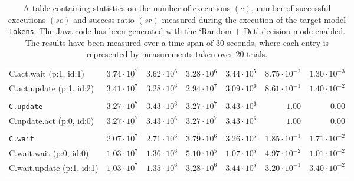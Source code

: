\begin{table}[htbp]
{\begin{tabular}{lrrrrrr}
\hspace{3mm}C.act.wait (p:1, id:1)    & $3.74 \cdot 10^{7}$ & $3.62 \cdot 10^{6}$ & $3.28 \cdot 10^{6}$ & $3.44 \cdot 10^{5}$ & $8.75 \cdot 10^{-2}$ & $1.30 \cdot 10^{-3}$ \\
\hspace{3mm}C.act.update (p:1, id:2)  & $3.41 \cdot 10^{7}$ & $3.28 \cdot 10^{6}$ & $2.94 \cdot 10^{7}$ & $3.09 \cdot 10^{6}$ & $8.61 \cdot 10^{-1}$ & $1.40 \cdot 10^{-2}$ \\
\\[-8pt]\texttt{C.update}             & $3.27 \cdot 10^{7}$ & $3.43 \cdot 10^{6}$ & $3.27 \cdot 10^{7}$ & $3.43 \cdot 10^{6}$ &               $1.00$ &               $0.00$ \\
\hspace{3mm}C.update.act (p:0, id:0)  & $3.27 \cdot 10^{7}$ & $3.43 \cdot 10^{6}$ & $3.27 \cdot 10^{7}$ & $3.43 \cdot 10^{6}$ &               $1.00$ &               $0.00$ \\
\\[-8pt]\texttt{C.wait}               & $2.07 \cdot 10^{7}$ & $2.71 \cdot 10^{6}$ & $3.79 \cdot 10^{6}$ & $3.26 \cdot 10^{5}$ & $1.85 \cdot 10^{-1}$ & $1.71 \cdot 10^{-2}$ \\
\hspace{3mm}C.wait.wait (p:0, id:0)   & $1.03 \cdot 10^{7}$ & $1.36 \cdot 10^{6}$ & $5.10 \cdot 10^{5}$ & $1.07 \cdot 10^{5}$ & $4.97 \cdot 10^{-2}$ & $1.01 \cdot 10^{-2}$ \\
\hspace{3mm}C.wait.update (p:1, id:1) & $1.03 \cdot 10^{7}$ & $1.35 \cdot 10^{6}$ & $3.28 \cdot 10^{6}$ & $3.44 \cdot 10^{5}$ & $3.20 \cdot 10^{-1}$ & $3.40 \cdot 10^{-2}$ \\
\bottomrule
\end{tabular}
}
\caption{A table containing statistics on the number of executions $(e)$, number of successful executions $(se)$ and success ratio $(sr)$ measured during the execution of the target model \texttt{Tokens}. The Java code has been generated with the `Random + Det' decision mode enabled. The results have been measured over a time span of 30 seconds, where each entry is represented by measurements taken over 20 trials.}
\label{table:frequency_results_tokens_random_det}
\end{table}